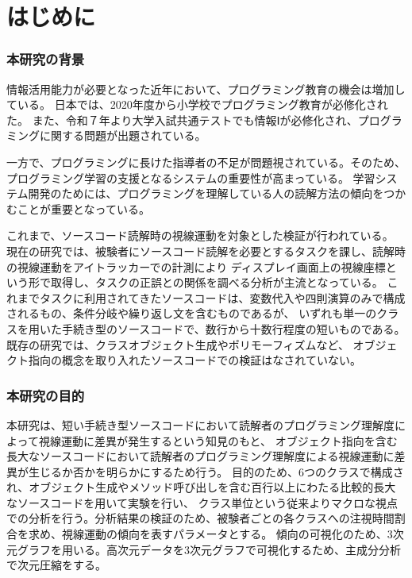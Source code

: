 \documentclass[paper=a4paper,fontsize=11pt]{jlreq}
\begin{document}
\tableofcontents
\clearpage

\part{はじめに}
  \section{本研究の背景}
    情報活用能力が必要となった近年において、プログラミング教育の機会は増加している。
    日本では、2020年度から小学校でプログラミング教育が必修化された\cite{syougaku_program}。
    また、令和７年より大学入試共通テストでも情報Ⅰが必修化され、プログラミングに関する問題が出題されている\cite{tusuto_mondai}。

    一方で、プログラミングに長けた指導者の不足が問題視されている。そのため、プログラミング学習の支援となるシステムの重要性が高まっている。
    学習システム開発のためには、プログラミングを理解している人の読解方法の傾向をつかむことが重要となっている。
    
    これまで、ソースコード読解時の視線運動を対象とした検証が行われている\cite{meiji2021}\cite{hanafusa}\cite{uwano}。
    現在の研究では、被験者にソースコード読解を必要とするタスクを課し、読解時の視線運動をアイトラッカーでの計測により
    ディスプレイ画面上の視線座標という形で取得し、タスクの正誤との関係を調べる分析が主流となっている。
    これまでタスクに利用されてきたソースコードは、変数代入や四則演算のみで構成されるもの、条件分岐や繰り返し文を含むものであるが、
    いずれも単一のクラスを用いた手続き型のソースコードで、数行から十数行程度の短いものである。既存の研究では、クラスオブジェクト生成やポリモーフィズムなど、
    オブジェクト指向の概念を取り入れたソースコードでの検証はなされていない。
  
  \section{本研究の目的}
    本研究は、短い手続き型ソースコードにおいて読解者のプログラミング理解度によって視線運動に差異が発生するという知見のもと、
    オブジェクト指向を含む長大なソースコードにおいて読解者のプログラミング理解度による視線運動に差異が生じるか否かを明らかにするため行う。
    目的のため、6つのクラスで構成され、オブジェクト生成やメソッド呼び出しを含む百行以上にわたる比較的長大なソースコードを用いて実験を行い、
    クラス単位という従来よりマクロな視点での分析を行う。分析結果の検証のため、被験者ごとの各クラスへの注視時間割合を求め、視線運動の傾向を表すパラメータとする。
    傾向の可視化のため、3次元グラフを用いる。高次元データを3次元グラフで可視化するため、主成分分析で次元圧縮をする。
    \clearpage
\end{document}
